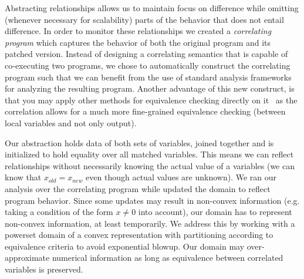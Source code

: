 Abstracting relationships allows us to maintain focus on difference while
omitting (whenever necessary for scalability) parts of the behavior that does
not entail difference. In order to monitor these relationships we created a
\emph{correlating program} which captures the behavior of both the original
program and its patched version. Instead of designing a correlating semantics
that is capable of co-executing two programs, we chose to automatically
construct the correlating program such that we can benefit from the use of
standard analysis frameworks for analyzing the resulting program. Another
advantage of this new construct, is that you may apply other methods for
equivalence checking directly on it~\cite{EnglerRamos11} as the correlation
allows for a much more fine-grained equivalence checking (between local
variables and not only output).

Our abstraction holds data of both sets of variables, joined together and is
initialized to hold equality over all matched variables. This means we can
reflect relationships without necessarily knowing the actual value of a
variables (we can know that $x_{old} = x_{new}$ even though actual values are
unknown). We ran our analysis over the correlating program while updated the
domain to reflect program behavior. Since some updates may result in non-convex information (e.g. taking  a condition of the form $x \neq 0$ into account), our domain has to represent non-convex information, at least temporarily. We address this by working with a powerset domain of a convex representation with partitioning according to equivalence criteria to avoid exponential blowup. Our domain may over-approximate numerical information as long as equivalence between correlated variables is preserved.

